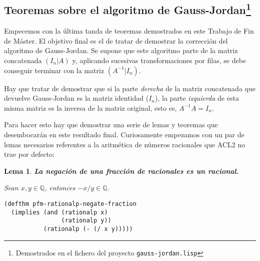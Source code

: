 \documentclass[a4paper,10pt]{article}
\newcommand{\Q}[1]{#1 \in \mathbb{Q}}
\newtheorem{lema}{{Lema}}
\begin{document}
\par \vspace{16pt}

\vspace{12pt}
\subsection[Teoremas sobre el algoritmo de Gauss-Jordan]{Teoremas sobre el algoritmo de Gauss-Jordan\footnote{Demostrados en el fichero del proyecto \texttt{gauss-jordan.lisp}}}
\vspace{10pt}

Empecemos con la última tanda de teoremas demostrados en este Trabajo de Fin de Máster. El objetivo final es el de tratar de demostrar la corrección del algoritmo de Gauss-Jordan. Se supone que este algoritmo parte de la matriz concatenada $(I_n|A)$ y, aplicando sucesivas transformaciones por filas, se debe conseguir terminar con la matriz $(A^{-1}|I_n)$. 

\par \vspace{10pt}

Hay que tratar de demostrar que si la parte \emph{derecha} de la matriz concatenada que devuelve Gauss-Jordan es la matriz identidad ($I_n$), la parte \emph{izquierda} de esta misma matriz es la inversa de la matriz original, esto es, $A^{-1}A = I_n$.

\par \vspace{10pt}

Para hacer esto hay que demostrar una serie de lemas y teoremas que desembocarán en este resultado final. Curiosamente empezamos con un par de lemas necesarios referentes a la aritmética de números racionales que ACL2 no trae por defecto:

\par \vspace{16pt}

\begin{lema} \textbf{La negación de una fracción de racionales es un racional.}\vspace{8pt}\par
Sean $\Q{x,y}$, entonces $\Q{-x/y}$.
\end{lema}

\begin{lstlisting}[language=clips]
(defthm pfm-rationalp-negate-fraction
  (implies (and (rationalp x)
                (rationalp y))
           (rationalp (- (/ x y)))))
\end{lstlisting}
\end{document}
